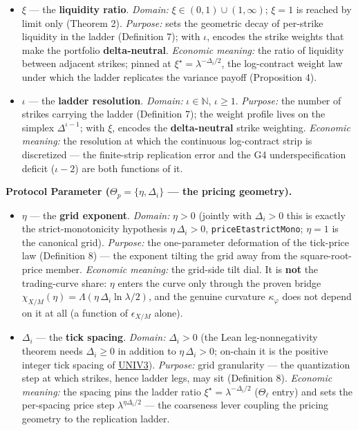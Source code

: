 \documentclass[11pt]{article}
\renewcommand{\_}{\textunderscore\allowbreak}
\begin{document}
\begin{itemize}
\item
  \(\xi\) --- the \textbf{liquidity ratio}. \emph{Domain:} \(\xi \in (0,1) \cup (1,\infty)\); \(\xi = 1\) is reached by limit only (Theorem 2). \emph{Purpose:} sets the geometric decay of per-strike liquidity in the ladder (Definition 7); with \(\iota\), encodes the strike weights that make the portfolio \textbf{delta-neutral}. \emph{Economic meaning:} the ratio of liquidity between adjacent strikes; pinned at \(\xi^{\star} = \lambda^{-\Delta_i/2}\), the log-contract weight law under which the ladder replicates the variance payoff (Proposition 4).
\item
  \(\iota\) --- the \textbf{ladder resolution}. \emph{Domain:} \(\iota \in \mathbb{N}\), \(\iota \ge 1\). \emph{Purpose:} the number of strikes carrying the ladder (Definition 7); the weight profile lives on the simplex \(\Delta^{\iota-1}\); with \(\xi\), encodes the \textbf{delta-neutral} strike weighting. \emph{Economic meaning:} the resolution at which the continuous log-contract strip is discretized --- the finite-strip replication error and the G4 underspecification deficit (\(\iota - 2\)) are both functions of it.
\end{itemize}

\textbf{Protocol Parameter (\(\Theta_{p} = \{\eta, \Delta_i\}\) --- the pricing geometry).}

\begin{itemize}
\item
  \(\eta\) --- the \textbf{grid exponent}. \emph{Domain:} \(\eta > 0\) (jointly with \(\Delta_i > 0\) this is exactly the strict-monotonicity hypothesis \(\eta\,\Delta_i > 0\), \texttt{priceEta\_strictMono}; \(\eta = 1\) is the canonical grid). \emph{Purpose:} the one-parameter deformation of the tick-price law (Definition 8) --- the exponent tilting the grid away from the square-root-price member. \emph{Economic meaning:} the grid-side tilt dial. It is \textbf{not} the trading-curve share: \(\eta\) enters the curve only through the proven bridge \(\chi_{X/M}(\eta) = \Lambda(\eta\,\Delta_i \ln\lambda/2)\), and the genuine curvature \(\kappa_{\varphi}\) does not depend on it at all (a function of \(\epsilon_{X/M}\) alone).
\item
  \(\Delta_i\) --- the \textbf{tick spacing}. \emph{Domain:} \(\Delta_i > 0\) (the Lean leg-nonnegativity theorem needs \(\Delta_i \geq 0\) in addition to \(\eta\,\Delta_i > 0\); on-chain it is the positive integer tick spacing of \href{../refs/uniswap-v3-core.pdf}{UNI\_V3}). \emph{Purpose:} grid granularity --- the quantization step at which strikes, hence ladder legs, may sit (Definition 8). \emph{Economic meaning:} the spacing pins the ladder ratio \(\xi^{\star} = \lambda^{-\Delta_i/2}\) (\(\Theta_{\ell}\) entry) and sets the per-spacing price step \(\lambda^{\eta\Delta_i/2}\) --- the coarseness lever coupling the pricing geometry to the replication ladder.
\end{itemize}
\end{document}
